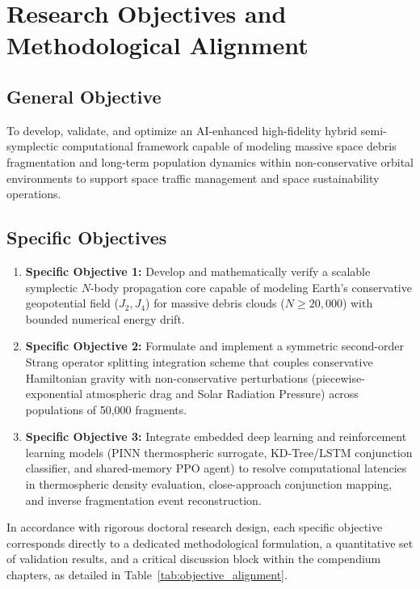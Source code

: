 \section{Research Objectives and Methodological Alignment}
\label{sec:objectives}

\subsection{General Objective}
To develop, validate, and optimize an AI-enhanced high-fidelity hybrid semi-symplectic computational framework capable of modeling massive space debris fragmentation and long-term population dynamics within non-conservative orbital environments to support space traffic management and space sustainability operations.

\subsection{Specific Objectives}
\begin{enumerate}
    \item \textbf{Specific Objective 1:} Develop and mathematically verify a scalable symplectic $N$-body propagation core capable of modeling Earth's conservative geopotential field ($J_2, J_4$) for massive debris clouds ($N \ge 20,000$) with bounded numerical energy drift.
    \item \textbf{Specific Objective 2:} Formulate and implement a symmetric second-order Strang operator splitting integration scheme that couples conservative Hamiltonian gravity with non-conservative perturbations (piecewise-exponential atmospheric drag and Solar Radiation Pressure) across populations of 50,000 fragments.
    \item \textbf{Specific Objective 3:} Integrate embedded deep learning and reinforcement learning models (PINN thermospheric surrogate, KD-Tree/LSTM conjunction classifier, and shared-memory PPO agent) to resolve computational latencies in thermospheric density evaluation, close-approach conjunction mapping, and inverse fragmentation event reconstruction.
\end{enumerate}

In accordance with rigorous doctoral research design, each specific objective corresponds directly to a dedicated methodological formulation, a quantitative set of validation results, and a critical discussion block within the compendium chapters, as detailed in Table~\ref{tab:objective_alignment}.

